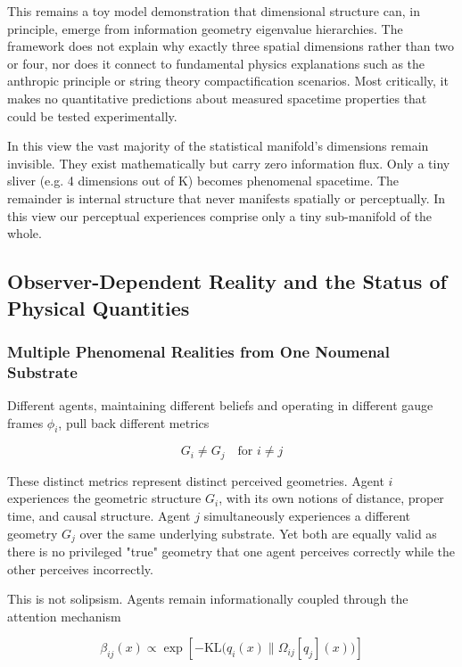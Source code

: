 \documentclass[11pt]{article}
\begin{document}
This remains a toy model demonstration that dimensional structure can, in principle, emerge from information geometry eigenvalue hierarchies. The framework does not explain why exactly three spatial dimensions rather than two or four, nor does it connect to fundamental physics explanations such as the anthropic principle or string theory compactification scenarios. Most critically, it makes no quantitative predictions about measured spacetime properties that could be tested experimentally.

In this view the vast majority of the statistical manifold's dimensions remain invisible.  They exist mathematically but carry zero information flux. Only a tiny sliver (e.g. 4 dimensions out of K) becomes phenomenal spacetime. The remainder is internal structure that never manifests spatially or perceptually.  In this view our perceptual experiences comprise only a tiny sub-manifold of the whole.


\subsection{Observer-Dependent Reality and the Status of Physical Quantities}
\label{sec:observer}

\subsubsection{Multiple Phenomenal Realities from One Noumenal Substrate}

Different agents, maintaining different beliefs and operating in different gauge frames $\phi_i$, pull back different metrics

\begin{equation}
G_i \neq G_j \quad \text{for } i \neq j
\end{equation}

These distinct metrics represent distinct perceived geometries. Agent $i$ experiences the geometric structure $G_i$, with its own notions of distance, proper time, and causal structure. Agent $j$ simultaneously experiences a different geometry $G_j$ over the same underlying substrate. Yet both are equally valid as there is no privileged "true" geometry that one agent perceives correctly while the other perceives incorrectly.

This is not solipsism. Agents remain informationally coupled through the attention mechanism

\begin{equation}
\beta_{ij}(x) \propto \exp\left[-\mathrm{KL}\big(q_i(x) \| \Omega_{ij}[q_j](x)\big)\right]
\end{equation}
\end{document}
